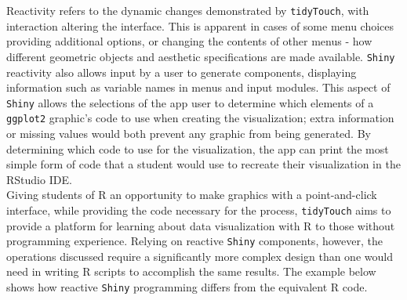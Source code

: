 \documentclass[english,man,floatsintext]{apa6}
\begin{document}
Reactivity refers to the dynamic changes demonstrated by \texttt{tidyTouch}, with interaction altering the interface. This is apparent in cases of some menu choices providing additional options, or changing the contents of other menus - how different geometric objects and aesthetic specifications are made available. \texttt{Shiny} reactivity also allows input by a user to generate components, displaying information such as variable names in menus and input modules. This aspect of \texttt{Shiny} allows the selections of the app user to determine which elements of a \texttt{ggplot2} graphic's code to use when creating the visualization; extra information or missing values would both prevent any graphic from being generated. By determining which code to use for the visualization, the app can print the most simple form of code that a student would use to recreate their visualization in the RStudio IDE.\\
Giving students of R an opportunity to make graphics with a point-and-click interface, while providing the code necessary for the process, \texttt{tidyTouch} aims to provide a platform for learning about data visualization with R to those without programming experience. Relying on reactive \texttt{Shiny} components, however, the operations discussed require a significantly more complex design than one would need in writing R scripts to accomplish the same results. The example below shows how reactive \texttt{Shiny} programming differs from the equivalent R code.
\end{document}

